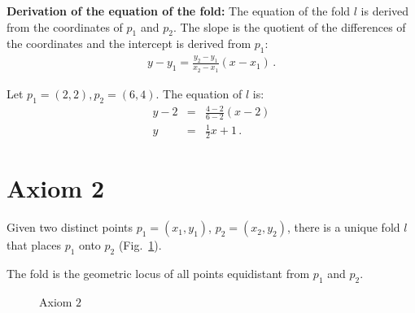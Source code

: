 \noindent\textbf{Derivation of the equation of the fold:}
The equation of the fold $l$ is derived from the coordinates of $p_1$ and $p_2$. The slope is the quotient of the differences of the coordinates and the intercept is derived from $p_1$:
\begin{align}
y - y_1 = \frac{y_2-y_1}{x_2-x_1}(x-x_1)\,.
\end{align}

\begin{example}
Let  $p_1=(2,2), p_2=(6,4)$. The equation of $l$ is:
\begin{eqnarray*}
y-2&=&\frac{4-2}{6-2}(x-2)\\
y&=&\frac{1}{2}x+1\,.
\end{eqnarray*}
\end{example}



\section{Axiom 2}\label{s.ax2}

\begin{axiom}
Given two distinct points $p_1=(x_1,y_1)$, $p_2=(x_2,y_2)$, there is a unique fold $l$ that places $p_1$ onto $p_2$ (Fig.~\ref{f.origami-axiom2}).
\end{axiom}

The fold is the geometric locus of all points equidistant from $p_1$ and $p_2$.

\begin{figure}[ht]
\begin{center}
\end{center}
\caption{Axiom $2$}\label{f.origami-axiom2}
\end{figure}

